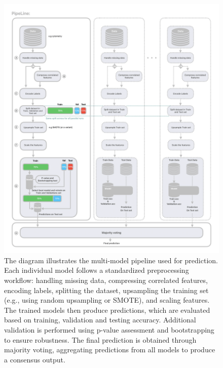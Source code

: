 \documentclass[12pt,a4paper]{report}
\begin{document}
\begin{figure}[H]
  \centering
  \hspace*{-0.9cm}
  \includegraphics[width=1.1\textwidth]{images/Pipeline-1.png}
  \caption[Consensus model pipeline diagram]{The diagram illustrates the multi-model pipeline used for prediction. Each individual model follows a standardized preprocessing workflow: handling missing data, compressing correlated features, encoding labels, splitting the dataset, upsampling the training set (e.g., using random upsampling or SMOTE), and scaling features. The trained models then produce predictions, which are evaluated based on training, validation and testing accuracy. Additional validation is performed using p-value assessment and bootstrapping to ensure robustness. The final prediction is obtained through majority voting, aggregating predictions from all models to produce a consensus output.}
  \label{fig:pipeline-1}
\end{figure}
\end{document}
